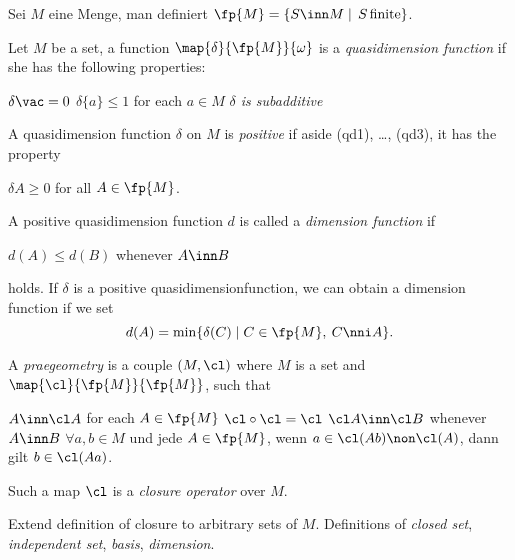 Sei $M$ eine Menge, man definiert $\fp{M}=\{S\inn M\mid\, S\,\text{finite}\}$.
\begin{dfn}
Let $M$ be a set, a function $\map{\delta}{\fp{M}}{\omega}$
is a \emph{quasidimension function} if she has the following properties:
\begin{itemize}
$\delta\vac=0$
 $\delta\{a\}\leq1$ for each $a\in M$
 \emph{$\delta$ is subadditive}
\end{itemize}
\end{dfn}
A quasidimension function $\delta$ on $M$ is \emph{positive} if aside
{\scriptsize(qd1)}, \dots, {\scriptsize(qd3)}, it has the property
\begin{itemize}
$\delta A\geq0$ for all $A\in\fp{M}$.
\end{itemize}

A positive quasidimension function $d$ is called a \emph{dimension
function} if
\begin{itemize}
$d(A)\leq d(B)$ whenever $A\inn B$
\end{itemize}
holds.
If $\delta$ is a positive quasidimensionfunction, we can obtain a dimension function if we set
$$d(A)=\min\{\delta(C)\mid C\in\fp{M},\:C\nni A\}.$$

\begin{dfn}A \emph{praegeometry} is a couple $(M,\cl)$ where $M$ is a set and $\map{\cl}{\fp{M}}{\fp{M}}$, such that
\begin{itemize}
$A\inn\cl A$ for each $A\in\fp{M}$
$\cl\circ\cl=\cl$
$\cl A\inn\cl B$ whenever $A\inn B$
$\forall a,b\in M$ und jede $A\in\fp{M}$, wenn $a\in\cl(Ab)\non\cl(A)$, dann gilt $b\in\cl(Aa)$.
\end{itemize}
Such a map $\cl$ is a \emph{closure operator} over $M$.
\end{dfn}
Extend definition of closure to arbitrary sets of $M$.
Definitions of \emph{closed set}, \emph{independent set}, \emph{basis}, \emph{dimension}.

